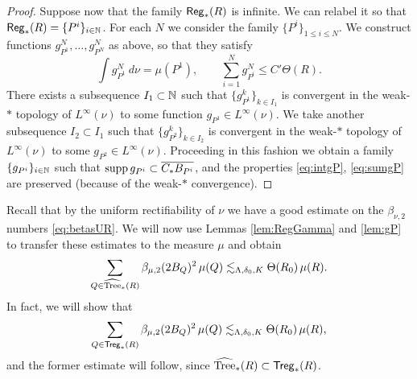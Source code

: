 \begin{proof}
	Suppose now that the family ${\mathsf{Reg}}_*(R)$ is infinite. We can relabel it so that ${\mathsf{Reg}}_*(R)=\{P^i\}_{i\in{\mathbb N}}$. For each $N$ we consider the family $\{P^i\}_{1\le i\le N}$. We construct functions $g_{P^1}^N,\dots, g_{P^N}^N$ as above, so that they satisfy
	\begin{equation*}
	\int g_{P^1}^N\ d\nu = \mu(P^1),\qquad \sum_{i=1}^{N} g_{P^i}^N \le C' \Theta(R).
	\end{equation*}
	There exists a subsequence $I_1\subset{\mathbb N}$ such that $\{g_{P^1}^k\}_{k\in I_1}$ is convergent in the weak-$*$ topology of $L^\infty(\nu)$ to some function $g_{P^1}\in L^{\infty}(\nu)$. We take another subsequence $I_2\subset I_1$ such that $\{g_{P^2}^k\}_{k\in I_2}$ is convergent in the weak-$*$ topology of $L^\infty(\nu)$ to some $g_{P^2}\in L^{\infty}(\nu)$. Proceeding in this fashion we obtain a family $\{g_{P^i}\}_{i\in{\mathbb N}}$ such that $\operatorname{supp} g_{P^i}\subset \overline{C_* B_{P^i}}$, and the properties \eqref{eq:intgP}, \eqref{eq:sumgP} are preserved (because of the weak-$*$ convergence).
\end{proof}

Recall that by the uniform rectifiability of $\nu$ we have a good estimate on the $\beta_{\nu,2}$ numbers \eqref{eq:betasUR}. We will now use Lemmas \ref{lem:RegGamma} and \ref{lem:gP} to transfer these estimates to the measure $\mu$ and obtain
\begin{equation*}
	\sum_{Q\in{\widehat{{\rm Tree}}}_*(R)}\beta_{\mu,2}(2B_Q)^2\,\mu(Q)\lesssim_{\Lambda,\delta_0,K}\Theta(R_0)\,\mu(R).
\end{equation*}
In fact, we will show that
\begin{equation*}
	\sum_{Q\in{\mathsf{Treg}}_*(R)}\beta_{\mu,2}(2B_Q)^2\,\mu(Q)\lesssim_{\Lambda,\delta_0,K}\Theta(R_0)\,\mu(R),
\end{equation*}
and the former estimate will follow, since ${\widehat{{\rm Tree}}}_*(R)\subset{\mathsf{Treg}}_*(R)$.

